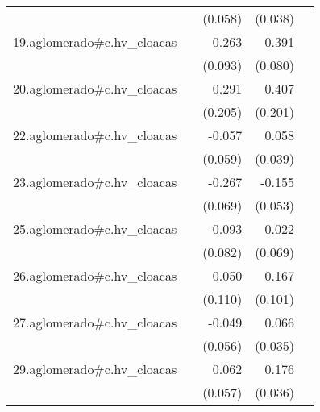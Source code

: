 {\begin{longtable}{l*{4}{D{.}{.}{-1}}}
            &                     &     (0.058)         &     (0.038)         &                     \\
\addlinespace
19.aglomerado#c.hv\_cloacas&                     &       0.263\sym{**} &       0.391\sym{***}&                     \\
            &                     &     (0.093)         &     (0.080)         &                     \\
\addlinespace
20.aglomerado#c.hv\_cloacas&                     &       0.291         &       0.407\sym{*}  &                     \\
            &                     &     (0.205)         &     (0.201)         &                     \\
\addlinespace
22.aglomerado#c.hv\_cloacas&                     &      -0.057         &       0.058         &                     \\
            &                     &     (0.059)         &     (0.039)         &                     \\
\addlinespace
23.aglomerado#c.hv\_cloacas&                     &      -0.267\sym{***}&      -0.155\sym{**} &                     \\
            &                     &     (0.069)         &     (0.053)         &                     \\
\addlinespace
25.aglomerado#c.hv\_cloacas&                     &      -0.093         &       0.022         &                     \\
            &                     &     (0.082)         &     (0.069)         &                     \\
\addlinespace
26.aglomerado#c.hv\_cloacas&                     &       0.050         &       0.167         &                     \\
            &                     &     (0.110)         &     (0.101)         &                     \\
\addlinespace
27.aglomerado#c.hv\_cloacas&                     &      -0.049         &       0.066         &                     \\
            &                     &     (0.056)         &     (0.035)         &                     \\
\addlinespace
29.aglomerado#c.hv\_cloacas&                     &       0.062         &       0.176\sym{***}&                     \\
            &                     &     (0.057)         &     (0.036)         &                     \\

\end{longtable}}
